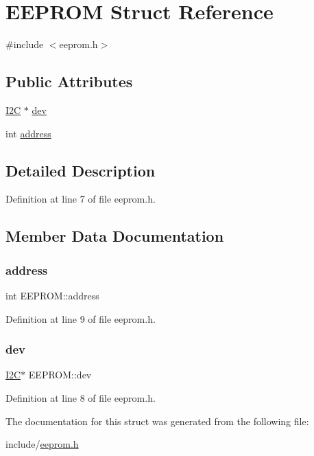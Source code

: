 \hypertarget{structEEPROM}{}\section{E\+E\+P\+R\+OM Struct Reference}
\label{structEEPROM}


{\ttfamily \#include $<$eeprom.\+h$>$}

\subsection*{Public Attributes}
\begin{DoxyCompactItemize}
\item 
\mbox{\hyperlink{structI2C}{I2C}} $\ast$ \mbox{\hyperlink{structEEPROM_af303303eb0c4cd3e3a9dae2b69a9b1fa}{dev}}
\item 
int \mbox{\hyperlink{structEEPROM_a441c10d444d33f7fbb5ae8b86294597e}{address}}
\end{DoxyCompactItemize}


\subsection{Detailed Description}


Definition at line 7 of file eeprom.\+h.



\subsection{Member Data Documentation}
\mbox{\label{structEEPROM_a441c10d444d33f7fbb5ae8b86294597e}} 
\subsubsection{\texorpdfstring{address}{address}}
{\footnotesize\ttfamily int E\+E\+P\+R\+O\+M\+::address}



Definition at line 9 of file eeprom.\+h.

\mbox{\label{structEEPROM_af303303eb0c4cd3e3a9dae2b69a9b1fa}} 
\subsubsection{\texorpdfstring{dev}{dev}}
{\footnotesize\ttfamily \mbox{\hyperlink{structI2C}{I2C}}$\ast$ E\+E\+P\+R\+O\+M\+::dev}



Definition at line 8 of file eeprom.\+h.



The documentation for this struct was generated from the following file\+:\begin{DoxyCompactItemize}
\item 
include/\mbox{\hyperlink{eeprom_8h}{eeprom.\+h}}\end{DoxyCompactItemize}
